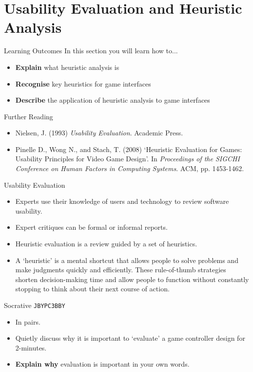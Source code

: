 \part{Usability Evaluation and Heuristic Analysis}
\frame{\partpage}

\begin{frame}{Learning Outcomes}
	In this section you will learn how to...
	
	\begin{itemize}
		\item \textbf{Explain} what heuristic analysis is
		\item \textbf{Recognise} key heuristics for game interfaces
		\item \textbf{Describe} the application of heuristic analysis to game interfaces
	\end{itemize}
\end{frame}

\begin{frame}{Further Reading}
	\begin{itemize}
		\item Nielsen, J. (1993) \textit{Usability Evaluation}. Academic Press.
		\item Pinelle D., Wong N., and Stach, T. (2008) `Heuristic Evaluation for Games: Usability Principles for Video Game Design'. In \textit{Proceedings of the SIGCHI Conference on Human Factors in Computing Systems}. ACM, pp. 1453-1462. 
	\end{itemize}
\end{frame}

\begin{frame}{Usability Evaluation}
	\begin{itemize}
		\item Experts use their knowledge of users and technology to review software usability.
		\item Expert critiques can be formal or informal reports.
		\item Heuristic evaluation is a review guided by a set of heuristics.
		\item A `heuristic' is a mental shortcut that allows people to solve problems and make judgments quickly 
		and efficiently. These rule-of-thumb strategies shorten decision-making time and allow people to function 
		without constantly stopping to think about their next course of action.
	\end{itemize}
\end{frame}

\begin{frame}[fragile]{Socrative \texttt{JBYPC3BBY}}
	\begin{itemize}
		\item In pairs.
		\item Quietly discuss why it is important to `evaluate' a game controller design for 2-minutes.
		\item \textbf{Explain why} evaluation is important in your own words.
	\end{itemize}
\end{frame}


